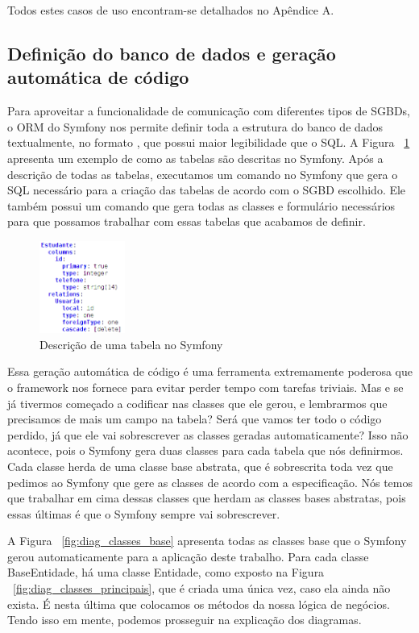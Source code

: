 Todos estes casos de uso encontram-se detalhados no Apêndice A.

\subsection{Definição do banco de dados e geração automática de código}
Para aproveitar a funcionalidade de comunicação com diferentes tipos de SGBDs, o ORM
do Symfony nos permite definir toda a estrutura do banco de dados textualmente, no formato
, que possui maior legibilidade que o SQL.
A Figura ~\ref{fig:tabela_yaml} apresenta um exemplo de como as tabelas são descritas no Symfony.
Após a descrição de todas as tabelas, executamos um comando no Symfony que gera o SQL necessário
para a criação das tabelas de acordo com o SGBD escolhido. Ele também possui um comando
que gera todas as classes e formulário necessários para que possamos trabalhar com essas tabelas
que acabamos de definir.

\begin{figure}[htbp]
\centering
\includegraphics[width=0.25\textwidth]{fig/tabela_yaml.png}
\caption{Descrição de uma tabela no Symfony}
\label{fig:tabela_yaml}
\end{figure}

Essa geração automática de código é uma ferramenta extremamente poderosa que o framework nos
fornece para evitar perder tempo com tarefas triviais. Mas e se já tivermos começado a codificar
nas classes que ele gerou, e lembrarmos que precisamos de mais um campo na tabela? Será que
vamos ter todo o código perdido, já que ele vai sobrescrever as classes geradas automaticamente?
Isso não acontece, pois o Symfony gera duas classes para cada tabela que nós definirmos. Cada classe
herda de uma classe base abstrata, que é sobrescrita toda vez que pedimos ao Symfony que gere
as classes de acordo com a especificação. Nós temos que trabalhar em cima dessas classes que
herdam as classes bases abstratas, pois essas últimas é que o Symfony sempre vai sobrescrever.

A Figura ~\ref{fig:diag_classes_base} apresenta todas as classes base que o Symfony gerou automaticamente
para a aplicação deste trabalho.
Para cada classe BaseEntidade, há uma classe Entidade, como exposto na Figura ~\ref{fig:diag_classes_principais}, 
que é criada uma única vez, caso ela ainda não exista. É nesta última que colocamos os métodos da nossa 
lógica de negócios. Tendo isso em mente, podemos prosseguir na explicação dos diagramas.

